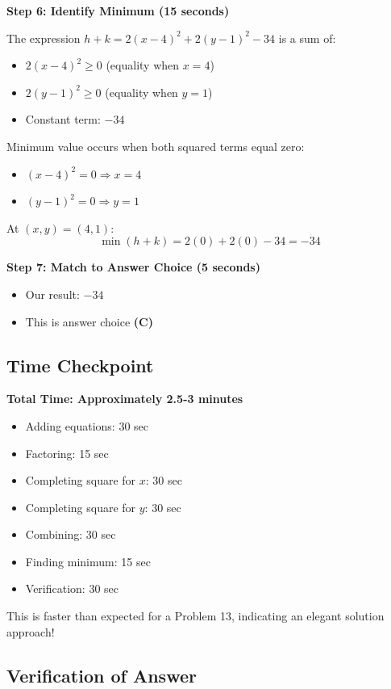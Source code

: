 \documentclass[12pt]{article}
\begin{document}
\begin{solutionbox}
\textbf{Step 6: Identify Minimum (15 seconds)}

The expression $h + k = 2(x - 4)^2 + 2(y - 1)^2 - 34$ is a sum of:
\begin{itemize}
    \item $2(x - 4)^2 \geq 0$ (equality when $x = 4$)
    \item $2(y - 1)^2 \geq 0$ (equality when $y = 1$)
    \item Constant term: $-34$
\end{itemize}

Minimum value occurs when both squared terms equal zero:
\begin{itemize}
    \item $(x - 4)^2 = 0 \Rightarrow x = 4$
    \item $(y - 1)^2 = 0 \Rightarrow y = 1$
\end{itemize}

At $(x, y) = (4, 1)$:
\[\min(h + k) = 2(0) + 2(0) - 34 = -34\]

\textbf{Step 7: Match to Answer Choice (5 seconds)}
\begin{itemize}
    \item Our result: $-34$
    \item This is answer choice \textbf{(C)}
\end{itemize}

\subsection*{Time Checkpoint}

\textbf{Total Time: Approximately 2.5-3 minutes}
\begin{itemize}
    \item Adding equations: 30 sec
    \item Factoring: 15 sec
    \item Completing square for $x$: 30 sec
    \item Completing square for $y$: 30 sec
    \item Combining: 30 sec
    \item Finding minimum: 15 sec
    \item Verification: 30 sec
\end{itemize}

This is faster than expected for a Problem 13, indicating an elegant solution approach!

\subsection*{Verification of Answer}


\end{solutionbox}
\end{document}
